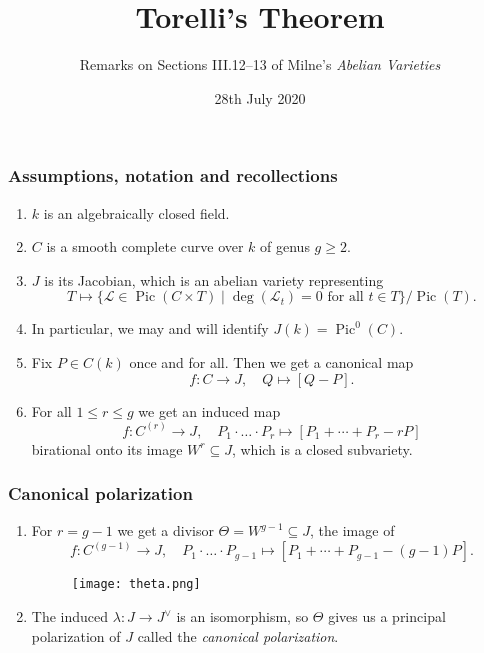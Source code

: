\documentclass[notheorems, hyperref]{beamer}
\title[Torelli's Theorem]{Torelli's Theorem}
\author{Remarks on Sections III.12--13 of Milne's \textit{Abelian Varieties}}
\institute{University of Freiburg}
\date{28th July 2020}
\theoremstyle{darkgreentheorem}
\theoremstyle{darkbluedefinition}
\theoremstyle{darkredexample}
\theoremstyle{remark}
\DeclareMathOperator{\Pic}{Pic}
\renewcommand{\L}{\mathcal{L}}
\newcommand{\dual}{^{\vee}}
\begin{document}
 
\frame{\titlepage}

\begin{frame}
    \frametitle{Assumptions, notation and recollections}
    \begin{enumerate}[label=\textbullet]
	\item $k$ is an algebraically closed field.
	    \pause
	\item $C$ is a smooth complete curve over $k$ of genus $g\geqslant 2$.
	    \pause
	\item $J$ is its Jacobian, which is an abelian variety representing
	    \[ T \mapsto \{ \L\in \Pic(C\times T) \mid \deg(\L_{t})=0 \text{ for all }t\in T \}/\Pic(T). \]
	    \vspace{-1em}
	    \pause
	\item In particular, we may and will identify $J(k)=\Pic^{0}(C)$.
	    \pause
	\item Fix $P\in C(k)$ once and for all.
	    Then we get a canonical map
	    \[ f\colon C\to J, \quad Q\mapsto [Q-P]. \]
	    \vspace{-1em}
	    \pause
	\item For all $1\leqslant r\leqslant g$ we get an induced map
	    \[ f\colon C^{(r)} \to J, \quad P_{1}\cdot \ldots \cdot P_{r}\mapsto [P_{1}+\cdots +P_{r}-rP] \]
	    birational onto its image $W^{r}\subseteq J$, which is a closed subvariety.
    \end{enumerate}
\end{frame}

\begin{frame}
    \frametitle{Canonical polarization}
    \begin{enumerate}[label=\textbullet]
	\item For $r=g-1$ we get a divisor $\Theta=W^{g-1}\subseteq J$, the image of
	    \[ f\colon C^{(g-1)}\to J, \quad P_{1}\cdot \ldots \cdot P_{g-1} \mapsto [P_{1}+\cdots +P_{g-1}-(g-1)P ]. \]
	    \vspace{-1em}
	    \pause
	    \begin{figure}[htp]
		\centering
		\texttt{[image: theta.png]}
	    \end{figure}
	    \pause
	\item The induced $\lambda \colon J\to J\dual$ is an isomorphism, so $\Theta$ gives us a principal polarization of $J$ called the \textit{canonical polarization}.
    \end{enumerate}
\end{frame}
\end{document}
